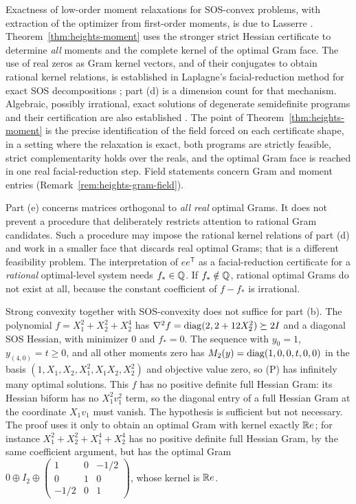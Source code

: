 Exactness of low-order moment relaxations for SOS-convex problems, with
extraction of the optimizer from first-order moments, is due to Lasserre
\cite[Theorems~2.6 and~3.3]{Lasserre2009}. Theorem~\ref{thm:heights-moment}
uses the stronger strict Hessian certificate to determine \emph{all} moments
and the complete kernel of the optimal Gram face. The use of real zeros as
Gram kernel vectors, and of their conjugates to obtain rational kernel
relations, is established in Laplagne's facial-reduction method for exact
SOS decompositions \cite[Proposition~3.2, Section~3.2]{Laplagne2020}; part
(d) is a dimension count for that mechanism. Algebraic, possibly irrational,
exact solutions of degenerate semidefinite programs and their certification
are also established \cite{KolmogorovNaldiZapata2024}. The point of
Theorem~\ref{thm:heights-moment} is the precise identification of the field
forced on each certificate shape, in a setting where the relaxation is exact,
both programs are strictly feasible, strict complementarity holds over the
reals, and the optimal Gram face is reached in one real facial-reduction
step. Field statements concern Gram and moment entries
(Remark~\ref{rem:heights-gram-field}).

Part (e) concerns matrices orthogonal to \emph{all real} optimal Grams. It
does not prevent a procedure that deliberately restricts attention to
rational Gram candidates. Such a procedure may impose the rational kernel
relations of part (d) and work in a smaller face that discards real optimal
Grams; that is a different feasibility problem. The interpretation of
$ee^{\mathsf T}$ as a facial-reduction certificate for a \emph{rational}
optimal-level system needs $f_*\in\mathbb Q$. If $f_*\notin\mathbb Q$, rational optimal
Grams do not exist at all, because the constant coefficient of $f-f_*$ is
irrational.

\begin{remark}
\label{rem:heights-moment-hypothesis}
Strong convexity together with SOS-convexity does not suffice for
part (b). The polynomial $f=X_1^2+X_2^2+X_2^4$ has
$\nabla^2f=\operatorname{diag}(2,2+12X_2^2)\succeq2I$ and a diagonal SOS Hessian, with
minimizer $0$ and $f_*=0$. The sequence with $y_0=1$, $y_{(4,0)}=t\ge0$, and
all other moments zero has $M_2(y)=\operatorname{diag}(1,0,0,t,0,0)$ in the basis
$(1,X_1,X_2,X_1^2,X_1X_2,X_2^2)$ and objective value zero, so (P) has
infinitely many optimal solutions. This $f$ has no positive definite full
Hessian Gram: its Hessian biform has no $X_1^2v_1^2$ term, so the diagonal
entry of a full Hessian Gram at the coordinate $X_1v_1$ must vanish. The
hypothesis is sufficient but not necessary. The proof uses it only to obtain
an optimal Gram with kernel exactly $\mathbb R e$; for instance
$X_1^2+X_2^2+X_1^4+X_2^4$ has no positive definite full Hessian Gram, by the
same coefficient argument, but has the optimal Gram
$0\oplus I_2\oplus\left(\begin{smallmatrix}1&0&-1/2\\0&1&0\\-1/2&0&1
\end{smallmatrix}\right)$, whose kernel is $\mathbb R e$.
\end{remark}

